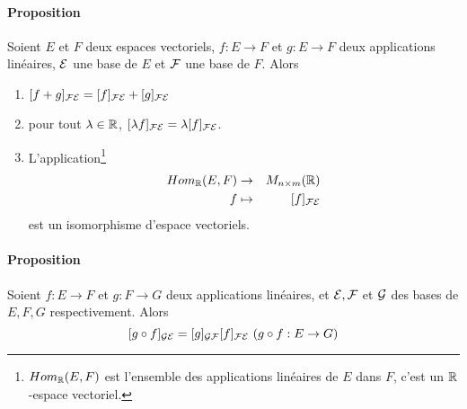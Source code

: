 \paragraph{Proposition} Soient $E$ et $F$ deux espaces vectoriels, $f: E \rightarrow F$ et $g: E \rightarrow F$ deux applications linéaires, $\mathcal{E}$ une base de $E$ et $\mathcal{F}$ une base de $F$. Alors
\begin{enumerate}
  \item $[f+ g]_{\mathcal{F} \mathcal{E}} = [f]_{\mathcal{F} \mathcal{E}} + [g]_{\mathcal{F} \mathcal{E}}$
  \item pour tout $\lambda \in \mathbb{R}$, $[\lambda f]_{\mathcal{F} \mathcal{E}} = \lambda [f]_{\mathcal{F} \mathcal{E}}$.
  \item L'application\footnote{$Hom_{\mathbb{R}}(E, F)$ est l'ensemble des applications linéaires de $E$ dans $F$, c'est un $\mathbb{R}$-espace vectoriel.}
    \begin{eqnarray*}
      Hom_{\mathbb{R}}(E, F) &\rightarrow& M_{n\times m}(\mathbb{R}) \\
      f &\mapsto& [f]_{\mathcal{F} \mathcal{E}}
    \end{eqnarray*}
    est un isomorphisme d'espace vectoriels.
\end{enumerate}

\paragraph{Proposition} Soient $f: E \rightarrow F$ et $g: F \rightarrow G$ deux applications linéaires, et $\mathcal{E}, \mathcal{F}$ et $\mathcal{G}$ des bases de $E, F, G$ respectivement. Alors
$$[g \circ f]_{\mathcal{G} \mathcal{E}} = [g]_{\mathcal{G} \mathcal{F}} [f]_{\mathcal{F} \mathcal{E}} ~ (g \circ f: E \rightarrow G)$$


